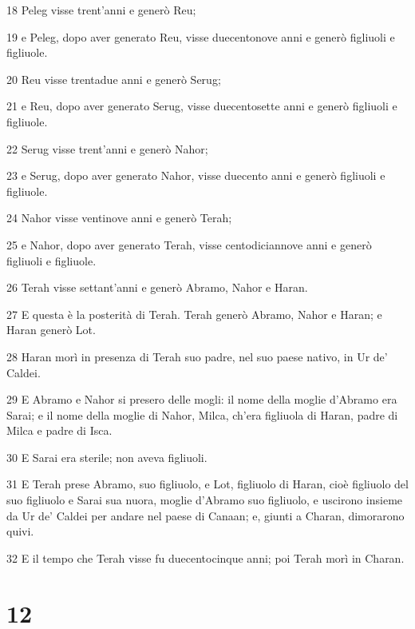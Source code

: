 \par 18 Peleg visse trent'anni e generò Reu;
\par 19 e Peleg, dopo aver generato Reu, visse duecentonove anni e generò figliuoli e figliuole.
\par 20 Reu visse trentadue anni e generò Serug;
\par 21 e Reu, dopo aver generato Serug, visse duecentosette anni e generò figliuoli e figliuole.
\par 22 Serug visse trent'anni e generò Nahor;
\par 23 e Serug, dopo aver generato Nahor, visse duecento anni e generò figliuoli e figliuole.
\par 24 Nahor visse ventinove anni e generò Terah;
\par 25 e Nahor, dopo aver generato Terah, visse centodiciannove anni e generò figliuoli e figliuole.
\par 26 Terah visse settant'anni e generò Abramo, Nahor e Haran.
\par 27 E questa è la posterità di Terah. Terah generò Abramo, Nahor e Haran; e Haran generò Lot.
\par 28 Haran morì in presenza di Terah suo padre, nel suo paese nativo, in Ur de' Caldei.
\par 29 E Abramo e Nahor si presero delle mogli: il nome della moglie d'Abramo era Sarai; e il nome della moglie di Nahor, Milca, ch'era figliuola di Haran, padre di Milca e padre di Isca.
\par 30 E Sarai era sterile; non aveva figliuoli.
\par 31 E Terah prese Abramo, suo figliuolo, e Lot, figliuolo di Haran, cioè figliuolo del suo figliuolo e Sarai sua nuora, moglie d'Abramo suo figliuolo, e uscirono insieme da Ur de' Caldei per andare nel paese di Canaan; e, giunti a Charan, dimorarono quivi.
\par 32 E il tempo che Terah visse fu duecentocinque anni; poi Terah morì in Charan.

\chapter{12}

